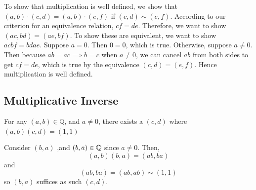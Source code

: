 To show that multiplication is well defined, we show that $(a,b) \cdot (c,d) = (a,b)\cdot(e,f)$ if $(c,d) \sim (e,f)$. According to our criterion for an equivalence relation, $cf = de$. Therefore, we want to show $(ac, bd) = (ae, bf)$. To show these are equivalent, we want to show $acbf=bdae$. Suppose $a=0$. Then $0=0$, which is true. Otherwise, suppose $a\neq0$. Then because $ab=ac\implies b=c$ when $a\neq0$, we can cancel $ab$ from both sides to get $cf=de$, which is true by the equivalence $(c,d)=(e,f)$. Hence multiplication is well defined.




\subsection{Multiplicative Inverse}

\begin{theorem}[]
    For any $(a,b)\in\mathbb{Q}$, and $a\neq0$, there exists a $(c,d)$ where $(a,b)(c,d)=(1,1)$
\end{theorem}

Consider $(b,a)$ ,and $(b,a)\in\mathbb{Q}$ since $a\neq0$. Then,
\[
(a,b)(b,a)=(ab,ba)
\]
and
\[
(ab,ba)=(ab,ab)\sim(1,1)
\]
so $(b,a)$ suffices as such $(c,d)$.

